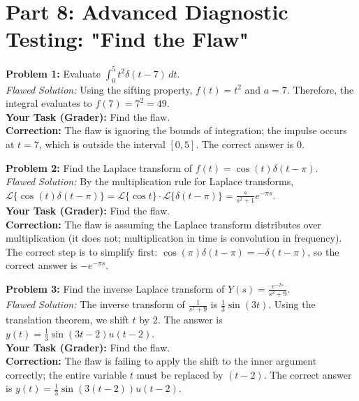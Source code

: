 \documentclass[11pt, letterpaper]{article}
\theoremstyle{definition}
\theoremstyle{remark}
\newcommand{\Laplace}{\mathcal{L}}
\begin{document}
\newpage
\section{Part 8: Advanced Diagnostic Testing: "Find the Flaw"}

\textbf{Problem 1:} Evaluate $\int_{0}^{5} t^2 \delta(t - 7) \, dt$.
\\[4pt]
\textit{Flawed Solution:} Using the sifting property, $f(t) = t^2$ and $a = 7$. Therefore, the integral evaluates to $f(7) = 7^2 = 49$.
\\[4pt]
\textbf{Your Task (Grader):} Find the flaw.
\\[4pt]
\textbf{Correction:} The flaw is ignoring the bounds of integration; the impulse occurs at $t=7$, which is outside the interval $[0, 5]$. The correct answer is $0$.

\vspace{1em}
\textbf{Problem 2:} Find the Laplace transform of $f(t) = \cos(t)\delta(t - \pi)$.
\\[4pt]
\textit{Flawed Solution:} By the multiplication rule for Laplace transforms, $\Laplace\{\cos(t)\delta(t-\pi)\} = \Laplace\{\cos t\} \cdot \Laplace\{\delta(t-\pi)\} = \frac{s}{s^2+1} e^{-\pi s}$.
\\[4pt]
\textbf{Your Task (Grader):} Find the flaw.
\\[4pt]
\textbf{Correction:} The flaw is assuming the Laplace transform distributes over multiplication (it does not; multiplication in time is convolution in frequency). The correct step is to simplify first: $\cos(\pi)\delta(t-\pi) = -\delta(t-\pi)$, so the correct answer is $-e^{-\pi s}$.

\vspace{1em}
\textbf{Problem 3:} Find the inverse Laplace transform of $Y(s) = \frac{e^{-2s}}{s^2 + 9}$.
\\[4pt]
\textit{Flawed Solution:} The inverse transform of $\frac{1}{s^2+9}$ is $\frac{1}{3}\sin(3t)$. Using the translation theorem, we shift $t$ by $2$. The answer is $y(t) = \frac{1}{3}\sin(3t - 2)u(t - 2)$.
\\[4pt]
\textbf{Your Task (Grader):} Find the flaw.
\\[4pt]
\textbf{Correction:} The flaw is failing to apply the shift to the inner argument correctly; the entire variable $t$ must be replaced by $(t-2)$. The correct answer is $y(t) = \frac{1}{3}\sin(3(t - 2))u(t - 2)$.
\end{document}
